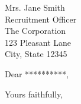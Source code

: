 \date{\today}

\begin{letter}
{Mrs. Jane Smith \\
Recruitment Officer \\
The Corporation \\
123 Pleasant Lane \\
City, State 12345}

\opening{Dear **********,}

\lipsum[1-8] %

 \closing{Yours faithfully, \\
      \\
 }


\end{letter}

